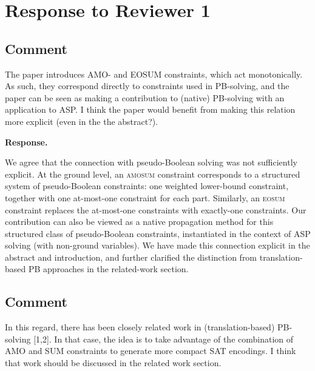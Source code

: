 \documentclass[11pt]{article}
\theoremstyle{definition}
\newcommand{\reviewertodo}{\subsection{\color{red}Comment}}
\newcommand{\revieweranswered}{\subsection{Comment}}
\newenvironment{response}{
    \color{blue} \textbf{Response.}
}{
}
\begin{document}



\section{Response to Reviewer 1}

\vspace{0.5cm}

\revieweranswered 
The paper introduces AMO- and EOSUM constraints, which act monotonically.
As such, they correspond directly to constraints used in PB-solving,
and the paper can be seen as making a contribution to (native) PB-solving
with an application to ASP. I think the paper would benefit from making
this relation more explicit (even in the the abstract?).

\begin{response}
We agree that the connection with pseudo-Boolean solving was not sufficiently explicit. At the ground level, an \textsc{amosum} constraint corresponds to a structured system of pseudo-Boolean constraints: one weighted lower-bound constraint, together with one at-most-one constraint for each part. Similarly, an \textsc{eosum} constraint replaces the at-most-one constraints with exactly-one constraints. Our contribution can also be viewed as a native propagation method for this structured class of pseudo-Boolean constraints, instantiated in the context of ASP solving (with non-ground variables). We have made this connection explicit in the abstract and introduction, and further clarified the distinction from translation-based PB approaches in the related-work section.
\end{response}

\vspace{0.5cm}

\revieweranswered
In this regard, there has been closely related work in (translation-based) PB-solving [1,2].
In that case, the idea is to take advantage of the combination of AMO and
SUM constraints to generate more compact SAT encodings.
I think that work should be discussed in the related work section.
\end{document}
